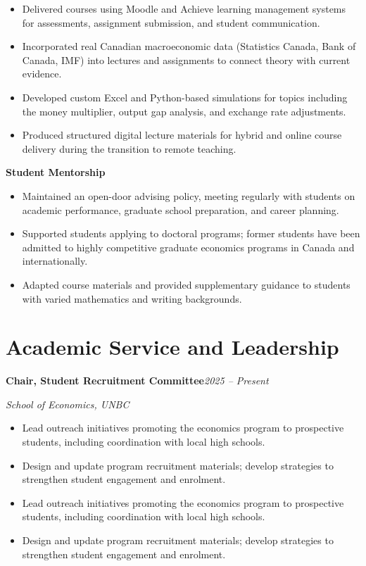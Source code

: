 \documentclass[11pt,letterpaper]{article}
\newcommand{\cventry}[4]{%
  \noindent\textbf{#2}\hfill\textit{\small #1}\par
  \noindent\textit{#3}\par
  \ifx\relax#4\relax\else
    \vspace{1pt}%
    #4%
  \fi
  \vspace{5pt}%
}
\begin{document}
\begin{itemize}
  \item Delivered courses using Moodle and Achieve learning management systems for assessments, assignment submission, and student communication.
  \item Incorporated real Canadian macroeconomic data (Statistics Canada, Bank of Canada, IMF) into lectures and assignments to connect theory with current evidence.
  \item Developed custom Excel and Python-based simulations for topics including the money multiplier, output gap analysis, and exchange rate adjustments.
  \item Produced structured digital lecture materials for hybrid and online course delivery during the transition to remote teaching.
\end{itemize}

\vspace{4pt}
\textbf{Student Mentorship}

\begin{itemize}
  \item Maintained an open-door advising policy, meeting regularly with students on academic performance, graduate school preparation, and career planning.
  \item Supported students applying to doctoral programs; former students have been admitted to highly competitive graduate economics programs in Canada and internationally.
  \item Adapted course materials and provided supplementary guidance to students with varied mathematics and writing backgrounds.
\end{itemize}

\section{Academic Service and Leadership}

\cventry{2025 -- Present}{Chair, Student Recruitment Committee}{School of Economics, UNBC}{%
  \begin{itemize}
    \item Lead outreach initiatives promoting the economics program to prospective students, including coordination with local high schools.
    \item Design and update program recruitment materials; develop strategies to strengthen student engagement and enrolment.
  \end{itemize}
}
\end{document}
